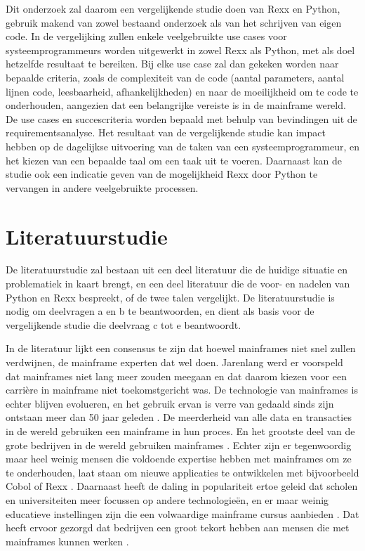 Dit onderzoek zal daarom een vergelijkende studie doen van Rexx en Python, gebruik makend van zowel bestaand onderzoek als van het schrijven van eigen code. In de vergelijking zullen enkele veelgebruikte use cases voor systeemprogrammeurs worden uitgewerkt in zowel Rexx als Python, met als doel hetzelfde resultaat te bereiken. Bij elke use case zal dan gekeken worden naar bepaalde criteria, zoals de complexiteit van de code (aantal parameters, aantal lijnen code, leesbaarheid, afhankelijkheden) en naar de moeilijkheid om te code te onderhouden, aangezien dat een belangrijke vereiste is in de mainframe wereld. De use cases en succescriteria worden bepaald met behulp van bevindingen uit de requirementsanalyse. Het resultaat van de vergelijkende studie kan impact hebben op de dagelijkse uitvoering van de taken van een systeemprogrammeur, en het kiezen van een bepaalde taal om een taak uit te voeren. Daarnaast kan de studie ook een indicatie geven van de mogelijkheid Rexx door Python te vervangen in andere veelgebruikte processen. 


\section{Literatuurstudie}%
\label{sec:literatuurstudie}

De literatuurstudie zal bestaan uit een deel literatuur die de huidige situatie en problematiek in kaart brengt, en een deel literatuur die de voor- en nadelen van Python en Rexx bespreekt, of de twee talen vergelijkt. De literatuurstudie is nodig om deelvragen a en b te beantwoorden, en dient als basis voor de vergelijkende studie die deelvraag c tot e beantwoordt.

In de literatuur lijkt een consensus te zijn dat hoewel mainframes niet snel zullen verdwijnen, de mainframe experten dat wel doen. Jarenlang werd er voorspeld dat mainframes niet lang meer zouden meegaan \autocite{Murphy2010, Sagers2018} en dat daarom kiezen voor een carrière in mainframe niet toekomstgericht was. De technologie van mainframes is echter blijven evolueren, en het gebruik ervan is verre van gedaald sinds zijn ontstaan meer dan 50 jaar geleden \autocite{NgoYe2018}. De meerderheid van alle data en transacties in de wereld gebruiken een mainframe in hun proces. En het grootste deel van de grote bedrijven in de wereld gebruiken mainframes \autocite{Murphy2010, NgoYe2018}. Echter zijn er tegenwoordig maar heel weinig mensen die voldoende expertise hebben met mainframes om ze te onderhouden, laat staan om nieuwe applicaties te ontwikkelen met bijvoorbeeld Cobol of Rexx \autocite{Phillips2013, Sagers2018}. Daarnaast heeft de daling in populariteit ertoe geleid dat scholen en universiteiten meer focussen op andere technologieën, en er maar weinig educatieve instellingen zijn die een volwaardige mainframe cursus aanbieden \autocite{NgoYe2018, Phillips2013}. Dat heeft ervoor gezorgd dat bedrijven een groot tekort hebben aan mensen die met mainframes kunnen werken \autocite{Murphy2010}. 

